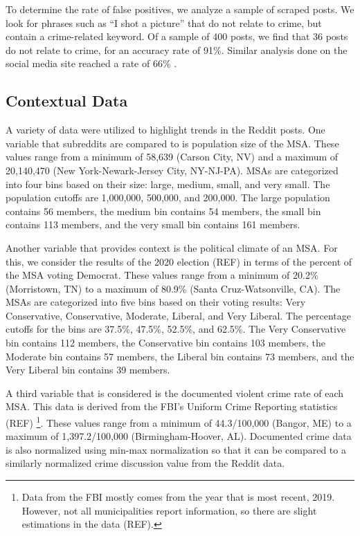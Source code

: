 \documentclass[12pt,oneside, letterpaper]{book}
\begin{document}
\par To determine the rate of false positives, we analyze a sample of scraped posts. We look for phrases such as ``I shot a picture'' that do not relate to crime, but contain a crime-related keyword. Of a sample of 400 posts, we find that 36 posts do not relate to crime, for an accuracy rate of 91\%. Similar analysis done on the social media site reached a rate of 66\% \cite{curiel}.

\subsection{Contextual Data}
\par A variety of data were utilized to highlight trends in the Reddit posts. One variable that subreddits are compared to is population size of the MSA. These values range from a minimum of 58,639 (Carson City, NV) and a maximum of 20,140,470 (New York-Newark-Jersey City, NY-NJ-PA). MSAs are categorized into four bins based on their size: large, medium, small, and very small. The population cutoffs are 1,000,000, 500,000, and 200,000. The large population contains 56 members, the medium bin contains 54 members, the small bin contains 113 members, and the very small bin contains 161 members.

\par Another variable that provides context is the political climate of an MSA. For this, we consider the results of the 2020 election (REF) in terms of the percent of the MSA voting Democrat. These values range from a minimum of 20.2\% (Morristown, TN) to a maximum of 80.9\% (Santa Cruz-Watsonville, CA). The MSAs are categorized into five bins based on their voting results: Very Conservative, Conservative, Moderate, Liberal, and Very Liberal. The percentage cutoffs for the bins are 37.5\%, 47.5\%, 52.5\%, and 62.5\%. The Very Conservative bin contains 112 members, the Conservative bin contains 103 members, the Moderate bin contains 57 members, the Liberal bin contains 73 members, and the Very Liberal bin contains 39 members.

\par A third variable that is considered is the documented violent crime rate of each MSA. This data is derived from the FBI's Uniform Crime Reporting statistics (REF) \footnote{Data from the FBI mostly comes from the year that is most recent, 2019. However, not all municipalities report information, so there are slight estimations in the data (REF).}. These values range from a minimum of 44.3/100,000 (Bangor, ME) to a maximum of 1,397.2/100,000 (Birmingham-Hoover, AL). Documented crime data is also normalized using min-max normalization so that it can be compared to a similarly normalized crime discussion value from the Reddit data.
\end{document}
